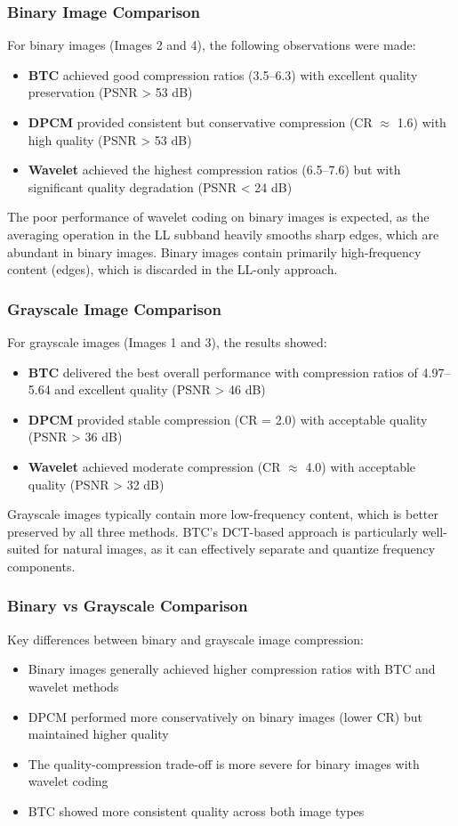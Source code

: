 \documentclass[12pt, a4paper]{AnantDocumentation}
\begin{document}
\subsubsection{Binary Image Comparison}
For binary images (Images 2 and 4), the following observations were made:
\begin{itemize}
	\item \textbf{BTC} achieved good compression ratios (3.5--6.3) with excellent quality preservation (PSNR > 53 dB)
	\item \textbf{DPCM} provided consistent but conservative compression (CR $\approx$ 1.6) with high quality (PSNR > 53 dB)
	\item \textbf{Wavelet} achieved the highest compression ratios (6.5--7.6) but with significant quality degradation (PSNR < 24 dB)
\end{itemize}

The poor performance of wavelet coding on binary images is expected, as the averaging operation in the LL subband heavily smooths sharp edges, which are abundant in binary images. Binary images contain primarily high-frequency content (edges), which is discarded in the LL-only approach.

\subsubsection{Grayscale Image Comparison}
For grayscale images (Images 1 and 3), the results showed:
\begin{itemize}
	\item \textbf{BTC} delivered the best overall performance with compression ratios of 4.97--5.64 and excellent quality (PSNR > 46 dB)
	\item \textbf{DPCM} provided stable compression (CR = 2.0) with acceptable quality (PSNR > 36 dB)
	\item \textbf{Wavelet} achieved moderate compression (CR $\approx$ 4.0) with acceptable quality (PSNR > 32 dB)
\end{itemize}

Grayscale images typically contain more low-frequency content, which is better preserved by all three methods. BTC's DCT-based approach is particularly well-suited for natural images, as it can effectively separate and quantize frequency components.

\subsubsection{Binary vs Grayscale Comparison}
Key differences between binary and grayscale image compression:
\begin{itemize}
	\item Binary images generally achieved higher compression ratios with BTC and wavelet methods
	\item DPCM performed more conservatively on binary images (lower CR) but maintained higher quality
	\item The quality-compression trade-off is more severe for binary images with wavelet coding
	\item BTC showed more consistent quality across both image types
\end{itemize}
\end{document}
